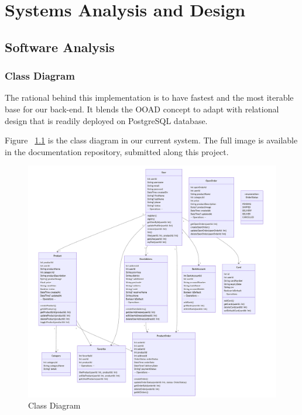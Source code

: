 %
%
\chapter{Systems Analysis and Design}

\section{Software Analysis}

\subsection{Class Diagram}

The rational behind this implementation is to have fastest and the most iterable base for our back-end. It blends the OOAD concept to adapt with relational design that is readily deployed on PostgreSQL database.

Figure ~\ref{fig:class} is the class diagram in our current system. The full image is available in the documentation repository, submitted along this project.

\begin{figure}[!h]
	\centering
	\includegraphics[width=1.1\textwidth]{chapters/ch-04/class.png} %
	\caption{Class Diagram}
	\label{fig:class} %
\end{figure}

